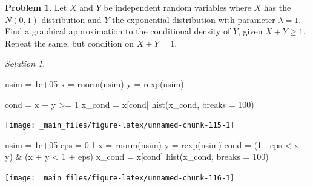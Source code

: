 \documentclass[
]{book}
\newenvironment{Shaded}{\begin{snugshade}}{\end{snugshade}}
\newcommand{\AttributeTok}[1]{\textcolor[rgb]{0.77,0.63,0.00}{#1}}
\newcommand{\DecValTok}[1]{\textcolor[rgb]{0.00,0.00,0.81}{#1}}
\newcommand{\FloatTok}[1]{\textcolor[rgb]{0.00,0.00,0.81}{#1}}
\newcommand{\FunctionTok}[1]{\textcolor[rgb]{0.00,0.00,0.00}{#1}}
\newcommand{\NormalTok}[1]{#1}
\newcommand{\OtherTok}[1]{\textcolor[rgb]{0.56,0.35,0.01}{#1}}
\newcommand{\SpecialCharTok}[1]{\textcolor[rgb]{0.00,0.00,0.00}{#1}}
\theoremstyle{definition}
\theoremstyle{definition}
\theoremstyle{definition}
\newtheorem{exercise}{Problem}[chapter]
\theoremstyle{definition}
\theoremstyle{remark}
\newtheorem*{solution}{Solution}
\begin{document}
\begin{exercise}
Let \(X\) and \(Y\) be independent random variables where \(X\) has the \(N(0,1)\) distribution and \(Y\) the exponential distribution with parameter \(\lambda=1\). Find a graphical approximation to the conditional density of \(Y\), given \(X+Y\geq 1\). Repeat the same, but condition on \(X+Y=1\).
\end{exercise}

\begin{solution}
~

\begin{Shaded}
\begin{Highlighting}[]
\NormalTok{nsim }\OtherTok{=} \FloatTok{1e+05}
\NormalTok{x }\OtherTok{=} \FunctionTok{rnorm}\NormalTok{(nsim)}
\NormalTok{y }\OtherTok{=} \FunctionTok{rexp}\NormalTok{(nsim)}

\NormalTok{cond }\OtherTok{=}\NormalTok{ x }\SpecialCharTok{+}\NormalTok{ y }\SpecialCharTok{\textgreater{}=} \DecValTok{1}
\NormalTok{x\_cond }\OtherTok{=}\NormalTok{ x[cond]}
\FunctionTok{hist}\NormalTok{(x\_cond, }\AttributeTok{breaks =} \DecValTok{100}\NormalTok{)}
\end{Highlighting}
\end{Shaded}

\begin{center}\texttt{[image: \_main\_files/figure-latex/unnamed-chunk-115-1]} \end{center}

\begin{Shaded}
\begin{Highlighting}[]
\NormalTok{nsim }\OtherTok{=} \FloatTok{1e+05}
\NormalTok{eps }\OtherTok{=} \FloatTok{0.1}
\NormalTok{x }\OtherTok{=} \FunctionTok{rnorm}\NormalTok{(nsim)}
\NormalTok{y }\OtherTok{=} \FunctionTok{rexp}\NormalTok{(nsim)}
\NormalTok{cond }\OtherTok{=}\NormalTok{ (}\DecValTok{1} \SpecialCharTok{{-}}\NormalTok{ eps }\SpecialCharTok{\textless{}}\NormalTok{ x }\SpecialCharTok{+}\NormalTok{ y) }\SpecialCharTok{\&}\NormalTok{ (x }\SpecialCharTok{+}\NormalTok{ y }\SpecialCharTok{\textless{}} \DecValTok{1} \SpecialCharTok{+}\NormalTok{ eps)}
\NormalTok{x\_cond }\OtherTok{=}\NormalTok{ x[cond]}
\FunctionTok{hist}\NormalTok{(x\_cond, }\AttributeTok{breaks =} \DecValTok{100}\NormalTok{)}
\end{Highlighting}
\end{Shaded}

\begin{center}\texttt{[image: \_main\_files/figure-latex/unnamed-chunk-116-1]} \end{center}


\end{solution}
\end{document}
